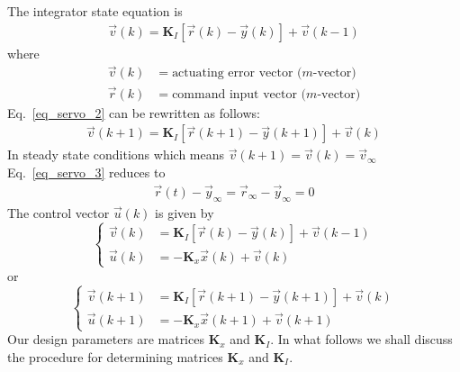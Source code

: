 \documentclass[11pt,a4paper,oneside]{book}
\numberwithin{equation}{section}
\theoremstyle{it}
\theoremstyle{definition}
\begin{document}
The integrator state equation is
\begin{equation}\label{eq_servo_2}
	\begin{aligned}
		\vec{v}(k) = \mathbf{K}_I\left[ 
		\vec{r}(k)-\vec{y}(k)\right]+\vec{v}(k-1) 
	\end{aligned}
\end{equation}
where 
\begin{equation}
	\begin{aligned}
		\vec{v}(k) &= \text{actuating error vector ($m$-vector)}\\[6pt]
		\vec{r}(k) &= \text{command input vector ($m$-vector)}
	\end{aligned}
\end{equation}
Eq.~\eqref{eq_servo_2} can be rewritten as follows:
\begin{equation}\label{eq_servo_3}
	\begin{aligned}
		\vec{v}(k+1) = \mathbf{K}_I\left[ 
		\vec{r}(k+1)-\vec{y}(k+1)\right]+\vec{v}(k) 
	\end{aligned}
\end{equation}
In steady state conditions which means 
$\vec{v}(k+1)=\vec{v}(k)=\vec{v}_{\infty}$ Eq.~\eqref{eq_servo_3} reduces to 
\begin{equation}\label{eq_servo_4}
	\begin{aligned}
		\vec{r}(t) - \vec{y}_{\infty} =\vec{r}_{\infty} - \vec{y}_{\infty} = 0
	\end{aligned}
\end{equation}
The control vector $\vec{u}(k)$ is given by 
\begin{equation}
	\left\lbrace 
	\begin{aligned}
		\vec{v}(k) &= \mathbf{K}_I\left[ 
		\vec{r}(k)-\vec{y}(k)\right]+\vec{v}(k-1) \\[6pt]
		\vec{u}(k) &= -\mathbf{K}_x\vec{x}(k)+\vec{v}(k) 
	\end{aligned}
	\right. 
\end{equation}
or
\begin{equation}\label{eq_servo_5}
	\left\lbrace 
	\begin{aligned}
		\vec{v}(k+1) &= \mathbf{K}_I\left[ 
		\vec{r}(k+1)-\vec{y}(k+1)\right]+\vec{v}(k) \\[6pt]
		\vec{u}(k+1) &= -\mathbf{K}_x\vec{x}(k+1)+\vec{v}(k+1) 
	\end{aligned}
	\right. 
\end{equation}
Our design parameters are matrices $\mathbf{K}_x$ and $\mathbf{K}_I$.
In what follows we shall discuss the procedure for determining matrices 
$\mathbf{K}_x$ and $\mathbf{K}_I$.
\end{document}
